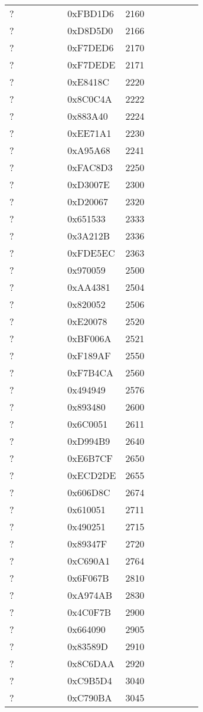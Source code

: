 \begin{longtable}{p{0.3\linewidth} p{0.3\linewidth} p{0.4\linewidth}}
? &  0xFBD1D6 &  2160\\
? &  0xD8D5D0 &  2166\\
? &  0xF7DED6 &  2170\\
? &  0xF7DEDE &  2171\\
? &  0xE8418C &  2220\\
? &  0x8C0C4A &  2222\\
? &  0x883A40 &  2224\\
? &  0xEE71A1 &  2230\\
? &  0xA95A68 &  2241\\
? &  0xFAC8D3 &  2250\\
? &  0xD3007E &  2300\\
? &  0xD20067 &  2320\\
? &  0x651533 &  2333\\
? &  0x3A212B &  2336\\
? &  0xFDE5EC &  2363\\
? &  0x970059 &  2500\\
? &  0xAA4381 &  2504\\
? &  0x820052 &  2506\\
? &  0xE20078 &  2520\\
? &  0xBF006A &  2521\\
? &  0xF189AF &  2550\\
? &  0xF7B4CA &  2560\\
? &  0x494949 &  2576\\
? &  0x893480 &  2600\\
? &  0x6C0051 &  2611\\
? &  0xD994B9 &  2640\\
? &  0xE6B7CF &  2650\\
? &  0xECD2DE &  2655\\
? &  0x606D8C &  2674\\
? &  0x610051 &  2711\\
? &  0x490251 &  2715\\
? &  0x89347F &  2720\\
? &  0xC690A1 &  2764\\
? &  0x6F067B &  2810\\
? &  0xA974AB &  2830\\
? &  0x4C0F7B &  2900\\
? &  0x664090 &  2905\\
? &  0x83589D &  2910\\
? &  0x8C6DAA &  2920\\
? &  0xC9B5D4 &  3040\\
? &  0xC790BA &  3045\\

\end{longtable}
